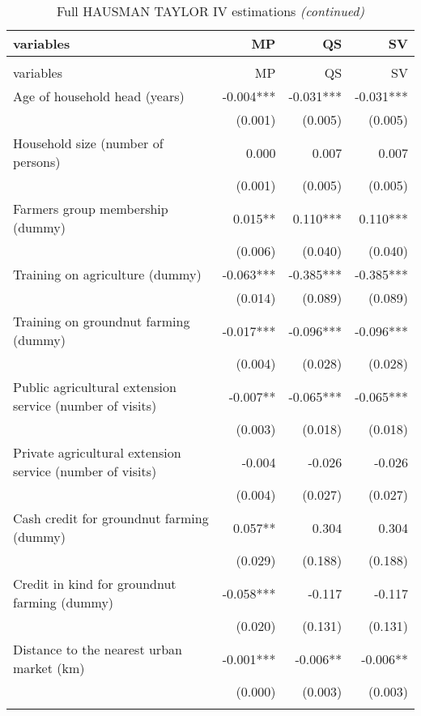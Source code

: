 \documentclass[
]{article}
\begin{document}
\begingroup\fontsize{7}{9}\selectfont

\begin{longtable}[t]{lrrr}
\caption{\label{tab:unnamed-chunk-17}Full HAUSMAN TAYLOR IV estimations}\\
\toprule
variables & MP & QS & SV\\
\midrule
\endfirsthead
\caption[]{\label{tab:unnamed-chunk-17}Full HAUSMAN TAYLOR IV estimations \textit{(continued)}}\\
\toprule
variables & MP & QS & SV\\
\midrule
\endhead

\endfoot
\bottomrule
\endlastfoot
Age of household head (years) & -0.004*** & -0.031*** & -0.031***\\
 & (0.001) & (0.005) & (0.005)\\
Household size (number of persons) & 0.000 & 0.007 & 0.007\\
 & (0.001) & (0.005) & (0.005)\\
Farmers group membership (dummy) & 0.015** & 0.110*** & 0.110***\\
\addlinespace
 & (0.006) & (0.040) & (0.040)\\
Training on agriculture (dummy) & -0.063*** & -0.385*** & -0.385***\\
 & (0.014) & (0.089) & (0.089)\\
Training on groundnut farming (dummy) & -0.017*** & -0.096*** & -0.096***\\
 & (0.004) & (0.028) & (0.028)\\
\addlinespace
Public agricultural extension service (number of visits) & -0.007** & -0.065*** & -0.065***\\
 & (0.003) & (0.018) & (0.018)\\
Private agricultural extension service (number of visits) & -0.004 & -0.026 & -0.026\\
 & (0.004) & (0.027) & (0.027)\\
Cash credit for groundnut farming (dummy) & 0.057** & 0.304 & 0.304\\
\addlinespace
 & (0.029) & (0.188) & (0.188)\\
Credit in kind for groundnut farming (dummy) & -0.058*** & -0.117 & -0.117\\
 & (0.020) & (0.131) & (0.131)\\
Distance to the nearest urban market (km) & -0.001*** & -0.006** & -0.006**\\
 & (0.000) & (0.003) & (0.003)\\
\addlinespace

\end{longtable}
\end{document}
